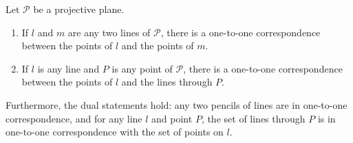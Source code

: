Let $\mathcal{P}$ be a projective plane.
\begin{enumerate}
  \item[(a)] If $l$ and $m$ are any two lines of $\mathcal{P}$, there is a one-to-one correspondence between the points of $l$ and the points of $m$.
  \item[(b)] If $l$ is any line and $P$ is any point of $\mathcal{P}$, there is a one-to-one correspondence between the points of $l$ and the lines through $P$.
\end{enumerate}
Furthermore, the dual statements hold: any two pencils of lines are in one-to-one correspondence, and for any line $l$ and point $P$, the set of lines through $P$ is in one-to-one correspondence with the set of points on $l$.
